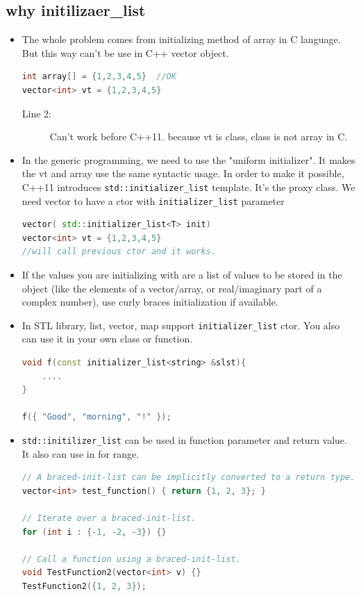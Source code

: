 \documentclass[a4paper,11pt,twoside]{book}
\begin{document}
\subsection{why initilizaer\_list}
\begin{itemize}
	\item The whole problem comes from initializing method of array in C language. But this way can't be use in C++ vector object.
\begin{lstlisting}[frame=single, language=c++,mathescape=true]
int array[] = {1,2,3,4,5}  //OK 
vector<int> vt = {1,2,3,4,5} 
\end{lstlisting}
\begin{description}
	\item[Line 2:] Can't work before C++11. because vt is class, class is not array in C. 
\end{description}	
	
	\item In the generic programming, we need to use the "uniform initializer". It  makes the vt and array use the same syntactic usage. In order to make it possible, C++11 introduces \texttt{std::initializer\_list} template. It's the proxy class. We need vector to have a ctor with \texttt{initializer\_list} parameter
\begin{lstlisting}[frame=single, language=c++,mathescape=true]
vector( std::initializer_list<T> init)
vector<int> vt = {1,2,3,4,5} 
//will call previous ctor and it works. 
\end{lstlisting}
	
	\item If the values you are initializing with are a list of values to be stored in the object (like the elements of a vector/array, or real/imaginary part of a complex number), use curly braces initialization if available.
	
	\item In STL library, list, vector, map support \texttt{initializer\_list} ctor. You also can use it in your own class or function.
\begin{lstlisting}[frame=single, language=c++,mathescape=true]
void f(const initializer_list<string> &slst){
	....
}
	
f({ "Good", "morning", "!" });
\end{lstlisting}
	
	\item \texttt{std::initilizer\_list} can be used in function parameter and return value. It also can use in for range.  
\begin{lstlisting}[frame=single, language=c++,mathescape=true]
// A braced-init-list can be implicitly converted to a return type.
vector<int> test_function() { return {1, 2, 3}; }
	
// Iterate over a braced-init-list.
for (int i : {-1, -2, -3}) {}
	
// Call a function using a braced-init-list.
void TestFunction2(vector<int> v) {}
TestFunction2({1, 2, 3}); 
\end{lstlisting}

\end{itemize}
\end{document}
